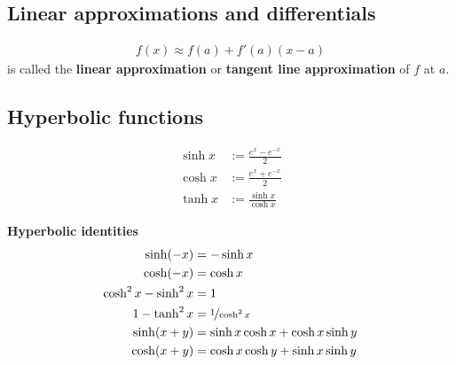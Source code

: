 \documentclass{article}
\begin{document}
\subsection{Linear approximations and differentials}
\begin{theorem}
	\begin{align*}
		f(x)\approx f(a)+f'(a)(x-a)
	\end{align*}
	is called the \textbf{linear approximation} or \textbf{tangent line approximation} of $f$ at $a$.
\end{theorem}
\subsection{Hyperbolic functions}
\begin{definition}
	\begin{align*}
		\sinh x & := \frac{e^x-e^{-x}}{2}    \\
		\cosh x & := \frac{e^x+e^{-x}}{2}    \\
		\tanh x & := \frac{\sinh x}{\cosh x}
	\end{align*}
\end{definition}
\begin{theorem}
	\textbf{Hyperbolic identities}
	\begin{align*}
		\sinh(-x)           & = -\sinh x                          \\
		\cosh(-x)           & = \cosh x                           \\
		\cosh^2x - \sinh^2x & = 1                                 \\
		1-\tanh^2 x         & = \nicefrac{1}{\cosh^2x}            \\
		\sinh(x+y)          & =\sinh x \cosh x + \cosh x \sinh y  \\
		\cosh(x+y)          & = \cosh x \cosh y + \sinh x \sinh y
	\end{align*}
\end{theorem}
\end{document}
